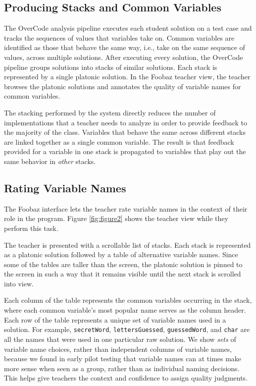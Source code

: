 \subsection{Producing Stacks and Common Variables}
The OverCode analysis pipeline executes each student solution on a test case and tracks the sequences of values that variables take on. Common variables are identified as those that behave the same way, i.e., take on the same sequence of values, across multiple solutions. After executing every solution, the OverCode pipeline groups solutions into stacks of similar solutions. Each stack is represented by a single platonic solution. In the Foobaz teacher view, the teacher browses the platonic solutions and annotates the quality of variable names for common variables. 

The stacking performed by the system directly reduces the number of implementations that a teacher needs to analyze in order to provide feedback to the majority of the class. Variables that behave the same across different stacks are linked together as a single common variable. The result is that feedback provided for a variable in one stack is propagated to variables that play out the same behavior in \emph{other} stacks.

\subsection{Rating Variable Names}

The Foobaz interface lets the teacher rate variable names in the context of their role in the program. Figure \ref{fig:figure2} shows the teacher view while they perform this task. 

The teacher is presented with a scrollable list of stacks. Each stack is represented as a platonic solution followed by a table of alternative variable names. Since some of the tables are taller than the screen, the platonic solution is pinned to the screen in such a way that it remains visible until the next stack is scrolled into view.

Each column of the table represents the common variables occurring in the stack, where each common variable's most popular name serves as the column header. Each row of the table represents a unique set of variable names used in a solution. For example, \texttt{secretWord}, \texttt{lettersGuessed}, \texttt{guessedWord}, and \texttt{char} are all the names that were used in one particular raw solution. We show \emph{sets} of variable name choices, rather than independent columns of variable names, because we found in early pilot testing that variable names can at times make more sense when seen as a group, rather than as individual naming decisions. This helps give teachers the context and confidence to assign quality judgments.

